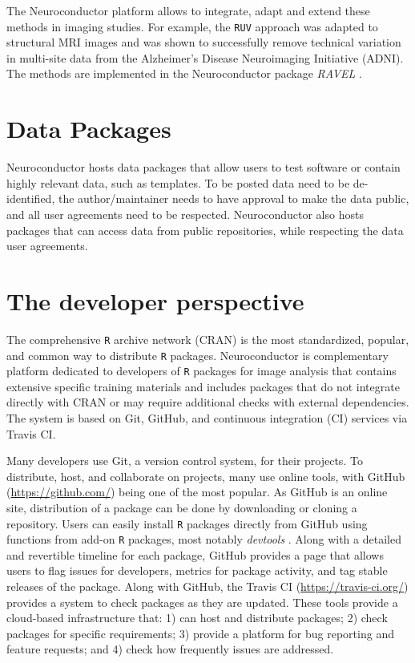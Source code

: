 \documentclass[]{elsarticle} %
\newcommand{\pkg}[1]{\emph{#1}}
\newcommand{\rlang}{\texttt{R}}
\begin{document}
The Neuroconductor platform allows to integrate, adapt and extend these methods in imaging studies. For example, the \texttt{RUV} approach was adapted to structural MRI images and was shown to successfully remove technical variation in multi-site data from the Alzheimer's Disease Neuroimaging Initiative (ADNI). The methods are implemented in the Neuroconductor package \pkg{RAVEL} \citep{ravel}. 

\section{Data Packages}\label{data-packages}
Neuroconductor hosts data packages that allow users to test
software or contain highly relevant data, such as templates. To be posted data need to be de-identified, the author/maintainer needs to have approval to make the data public, and all user agreements need to be respected. Neuroconductor also hosts packages that can access data from public repositories, while respecting the data user agreements.

\section{The developer perspective}\label{section:dev_perspective}

The comprehensive {\rlang} archive network (CRAN) is the most standardized, popular, and common way to distribute {\rlang} packages. Neuroconductor is complementary platform dedicated to developers of {\rlang} packages for image analysis that contains extensive specific training materials and includes packages that do not integrate directly with CRAN or may require additional checks with external dependencies.  The system is based on Git, GitHub, and continuous integration (CI) services via Travis CI.

Many developers use Git, a version control system, for their projects.  To distribute, host, and collaborate on  projects, many use online tools, with GitHub (\url{https://github.com/}) being one of the most popular.  As GitHub is an online site, distribution of a package can be done by downloading or cloning a repository.  Users can easily install {\rlang} packages directly from GitHub using functions from add-on {\rlang} packages, most notably \pkg{devtools} \cite{devtools}.  Along with a detailed and revertible timeline for each package, GitHub provides a page that allows users to flag issues for developers, metrics for package activity, and tag stable releases of the package.  Along with GitHub, the Travis CI (\url{https://travis-ci.org/}) provides a system to check packages as they are updated.  These tools provide a cloud-based infrastructure that: 1) can host and distribute packages; 2) check packages for specific requirements; 3) provide a platform for bug reporting and feature requests; and 4) check how frequently issues are addressed.
\end{document}
